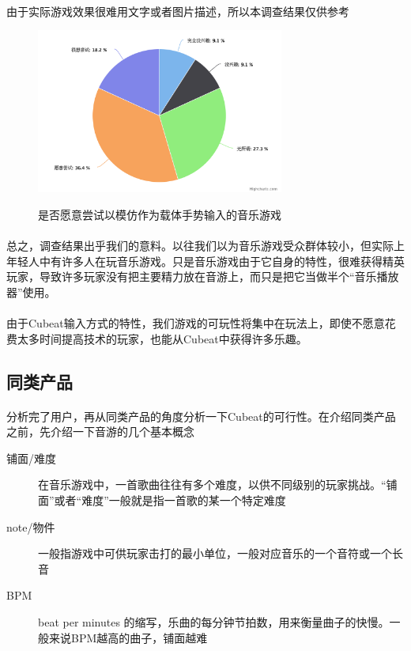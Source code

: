 \documentclass{article} \usepackage{CJK}
\begin{document}
\paragraph{}
由于实际游戏效果很难用文字或者图片描述，所以本调查结果仅供参考
\begin{figure}[H]
  \centering
  \includegraphics[width=22em]{chart5.png}\\
  \caption{是否愿意尝试以模仿作为载体手势输入的音乐游戏}\label{2-5}
\end{figure}
\paragraph{}
总之，调查结果出乎我们的意料。以往我们以为音乐游戏受众群体较小，但实际上年轻人中有许多人在玩音乐游戏。只是音乐游戏由于它自身的特性，很难获得精英玩家，导致许多玩家没有把主要精力放在音游上，而只是把它当做半个“音乐播放器”使用。
\paragraph{}
由于Cubeat输入方式的特性，我们游戏的可玩性将集中在玩法上，即使不愿意花费太多时间提高技术的玩家，也能从Cubeat中获得许多乐趣。
\subsection{同类产品}
\paragraph{}
分析完了用户，再从同类产品的角度分析一下Cubeat的可行性。在介绍同类产品之前，先介绍一下音游的几个基本概念
\begin{description}
  \item[铺面/难度] 在音乐游戏中，一首歌曲往往有多个难度，以供不同级别的玩家挑战。“铺面”或者“难度”一般就是指一首歌的某一个特定难度
  \item[note/物件] 一般指游戏中可供玩家击打的最小单位，一般对应音乐的一个音符或一个长音
  \item[BPM] beat per minutes 的缩写，乐曲的每分钟节拍数，用来衡量曲子的快慢。一般来说BPM越高的曲子，铺面越难
\end{description}
\end{document}
